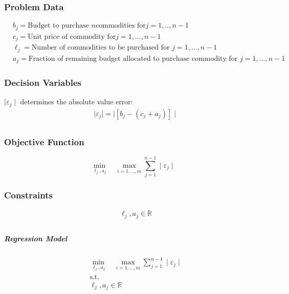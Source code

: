 \documentclass[12pt]{article}
\begin{document}
\subsubsection{Problem Data}
\begin{equation*}
    \begin{split}
        &b_j= \text{Budget to purchase }n \text{commodities for} j=1,..,n-1\\
        &c_j=\text{Unit price of commodity for} j=1,...,n-1\\
        &\ell_j= \text{Number of commodities to be purchased for } j=1,...,n-1\\
        &a_j= \text{Fraction of remaining budget allocated to purchase commodity for } j=1,...,n-1
    \end{split}
\end{equation*}
\subsubsection{Decision Variables}
    \( \mid \varepsilon_j  \mid \) determines the absolute value error:
    \begin{align*}    
        &\mid \varepsilon_j \mid= \mid [b_j-(c_j + a_j)]\mid\\
    \end{align*}

\subsubsection{Objective Function}
\begin{equation*}
    \min_{\ell_j,a_j} \quad \max_{i=1,...,m} \sum_{j=1}^{n-1} \mid \varepsilon_j \mid
\end{equation*}

\subsubsection{Constraints}
    \begin{align*}
        &\ell_j, a_j \in \mathbb{R}\\
    \end{align*}
\subparagraph{Regression Model}
    \begin{align*}
        &\min_{\ell_j,a_j} \quad \max_{i=1,...,m} \sum_{j=1}^{n-1} \mid \varepsilon_j \mid\\
        &\text{s.t.}\\
        &\ell_j, a_j \in \mathbb{R} \\
    \end{align*}
  
\end{document}

